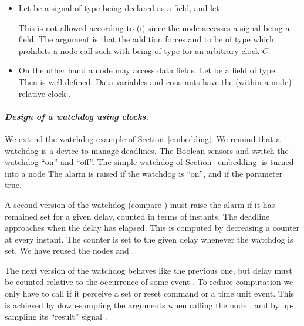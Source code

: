 {\begin{itemize}
\item Let \emph{} be a signal of type \emph{} being declared as a field, and let
%

%
This is not allowed according to (i) since the node accesses a signal being a field.
The argument is that the addition forces \emph{} and \emph{}
to be of type \emph{} which prohibits a node
call such \emph{} with \emph{} being of type \emph{} for an arbitrary clock $C$.

\item On the other hand a node may access data fields. Let \emph{} be a field of type \emph{}. Then
%
%
is well defined. Data variables and constants have the (within a node) relative clock \emph{}.
\end{itemize}
%

\paragraph{\textit{Design of a watchdog using clocks.}} We extend the watchdog example
of Section~\ref{embedding}. We remind that a watchdog is a device to manage 
deadlines. The Boolean sensors \emph{} and \emph{} switch the watchdog ``on'' and ``off''. The simple watchdog of Section~\ref{embedding} is turned into a node
%
%
The alarm is raised if the watchdog is ``on'', and if the parameter \emph{} true.

A second version of the watchdog (compare \cite{halbwachs}) must raise the 
alarm if it has remained set for a given delay, counted in terms of instants.
%
%
The deadline approaches when the delay has elapsed. This is computed by
decreasing a counter at every instant. The counter is set to the given delay 
whenever the watchdog is set. We have reused the nodes \emph{}
and \emph{}.

The next version of the watchdog behaves like the previous one, but delay must be counted relative to the occurrence of some event \emph{}. To reduce computation we only have to call
\emph{} if it perceive a  set or reset command or a time unit event. This is achieved by down-sampling the arguments when calling
the node \emph{}, and by up-sampling its ``result'' signal \emph{}.
%
%

}


